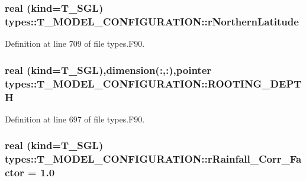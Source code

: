 \hypertarget{typetypes_1_1_t___m_o_d_e_l___c_o_n_f_i_g_u_r_a_t_i_o_n_ae444174001e9bcab2e1e7b90823f7c03}{
\subsubsection[{rNorthernLatitude}]{\setlength{\rightskip}{0pt plus 5cm}real (kind={\bf T\_\-SGL}) {\bf types::T\_\-MODEL\_\-CONFIGURATION::rNorthernLatitude}}}
\label{typetypes_1_1_t___m_o_d_e_l___c_o_n_f_i_g_u_r_a_t_i_o_n_ae444174001e9bcab2e1e7b90823f7c03}


Definition at line 709 of file types.F90.

\hypertarget{typetypes_1_1_t___m_o_d_e_l___c_o_n_f_i_g_u_r_a_t_i_o_n_a2947ed88af34c595e1dccf7370e16753}{
\subsubsection[{ROOTING\_\-DEPTH}]{\setlength{\rightskip}{0pt plus 5cm}real (kind={\bf T\_\-SGL}),dimension(:,:),pointer {\bf types::T\_\-MODEL\_\-CONFIGURATION::ROOTING\_\-DEPTH}}}
\label{typetypes_1_1_t___m_o_d_e_l___c_o_n_f_i_g_u_r_a_t_i_o_n_a2947ed88af34c595e1dccf7370e16753}


Definition at line 697 of file types.F90.

\hypertarget{typetypes_1_1_t___m_o_d_e_l___c_o_n_f_i_g_u_r_a_t_i_o_n_a5240408f50d8ffd3c3c91a59c6809fa0}{
\subsubsection[{rRainfall\_\-Corr\_\-Factor}]{\setlength{\rightskip}{0pt plus 5cm}real (kind={\bf T\_\-SGL}) {\bf types::T\_\-MODEL\_\-CONFIGURATION::rRainfall\_\-Corr\_\-Factor} = 1.0}}
\label{typetypes_1_1_t___m_o_d_e_l___c_o_n_f_i_g_u_r_a_t_i_o_n_a5240408f50d8ffd3c3c91a59c6809fa0}


